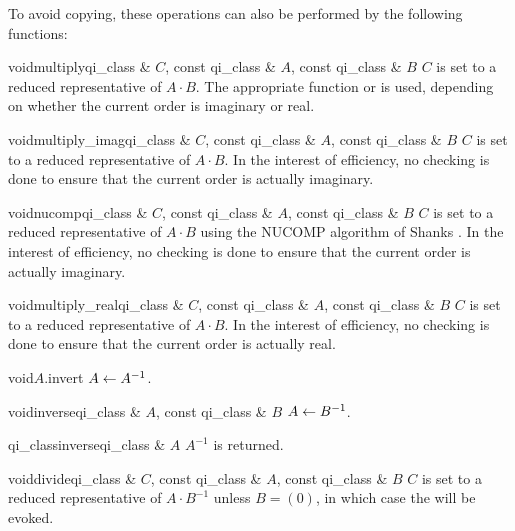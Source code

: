 To avoid copying, these operations can also be performed by the following functions:

\begin{fcode}{void}{multiply}{qi_class & $C$, const qi_class & $A$, const qi_class & $B$}
  $C$ is set to a reduced representative of $A \cdot B$.  The appropriate function
   or  is used, depending on whether the current order
  is imaginary or real.
\end{fcode}

\begin{fcode}{void}{multiply_imag}{qi_class & $C$, const qi_class & $A$, const qi_class & $B$}
  $C$ is set to a reduced representative of $A \cdot B$.  In the interest of efficiency, no
  checking is done to ensure that the current order is actually imaginary.
\end{fcode}

\begin{fcode}{void}{nucomp}{qi_class & $C$, const qi_class & $A$, const qi_class & $B$}
  $C$ is set to a reduced representative of $A \cdot B$ using the NUCOMP algorithm of Shanks
  \cite{Cohen:1995}.  In the interest of efficiency, no checking is done to ensure that the
  current order is actually imaginary.
\end{fcode}

\begin{fcode}{void}{multiply_real}{qi_class & $C$, const qi_class & $A$, const qi_class & $B$}
  $C$ is set to a reduced representative of $A \cdot B$.  In the interest of efficiency, no
  checking is done to ensure that the current order is actually real.
\end{fcode}

\begin{fcode}{void}{$A$.invert}{}
  $A \leftarrow A^{-1}$.
\end{fcode}

\begin{fcode}{void}{inverse}{qi_class & $A$, const qi_class & $B$}
  $A \leftarrow B^{-1}$.
\end{fcode}

\begin{fcode}{qi_class}{inverse}{qi_class & $A$}
  $A^{-1}$ is returned.
\end{fcode}

\begin{fcode}{void}{divide}{qi_class & $C$, const qi_class & $A$, const qi_class & $B$}
  $C$ is set to a reduced representative of $A \cdot B^{-1}$ unless $B = (0)$, in which case the
  \LEH will be evoked.
\end{fcode}

